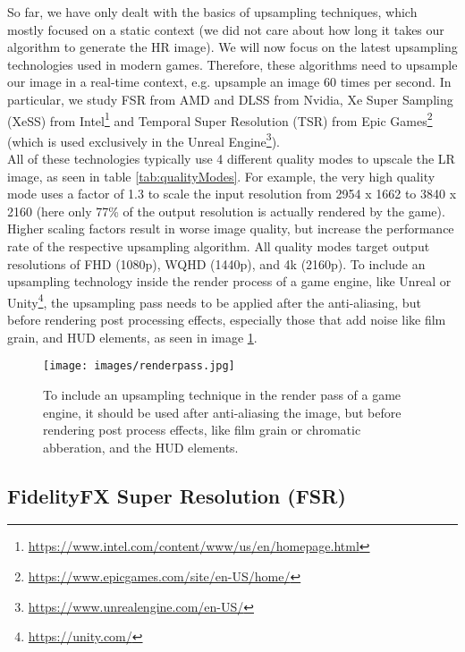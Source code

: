 \documentclass[letterpaper, 10 pt, conference]{ieeeconf}  %
\begin{document}
So far, we have only dealt with the basics of upsampling techniques, which mostly focused on a static context (we did not care about how long it takes our algorithm to generate the HR image).
We will now focus on the latest upsampling technologies used in modern games. Therefore, these algorithms need to upsample our image in a real-time context, e.g. upsample an image 60 times per second.
In particular, we study FSR from AMD and DLSS from Nvidia, 
Xe Super Sampling (XeSS) \cite{XeSS_intro} from Intel\footnote{\url{https://www.intel.com/content/www/us/en/homepage.html}} 
and Temporal Super Resolution (TSR) \cite{TSR_intro} from Epic Games\footnote{\url{https://www.epicgames.com/site/en-US/home/}} (which is used exclusively in the Unreal Engine\footnote{\url{https://www.unrealengine.com/en-US/}}). \\
All of these technologies typically use 4 different quality modes to upscale the LR image, as seen in table \ref{tab:qualityModes}. 
For example, the very high quality mode uses a factor of 1.3 to scale the input resolution from 2954 x 1662 to 3840 x 2160 (here only 77\% of the output resolution is actually rendered by the game).
Higher scaling factors result in worse image quality, but increase the performance rate of the respective upsampling algorithm.
All quality modes target output resolutions of FHD (1080p), WQHD (1440p), and 4k (2160p).
To include an upsampling technology inside the render process of a game engine, like Unreal or Unity\footnote{\url{https://unity.com/}}, 
the upsampling pass needs to be applied after the anti-aliasing, but before rendering post processing effects, especially those that add noise like film grain, and HUD elements, as seen in image \ref{fig:renderpass}.

\begin{figure}[!ht]
    \caption{To include an upsampling technique in the render pass of a game engine, 
    it should be used after anti-aliasing the image, but before rendering post process effects, 
    like film grain or chromatic abberation, and the HUD elements.}
    \centering
    \texttt{[image: images/renderpass.jpg]}
    \label{fig:renderpass}
\end{figure}

\subsection{FidelityFX Super Resolution (FSR)}
\end{document}

